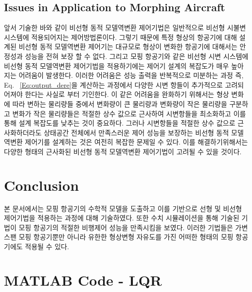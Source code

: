 \documentclass[a4paper, 12pt]{report}
\begin{document}
	\section{Issues in Application to Morphing Aircraft}
	
	앞서 기술한 바와 같이 비선형 동적 모델역변환 제어기법은 일반적으로 비선형 시불변 시스템에 적용되어지는 제어방법론이다. 그렇기 때문에 특정 형상의 항공기에 대해 설계된 비선형 동적 모델역변환 제어기는 대규모로 형상이 변화한 항공기에 대해서는 안정성과 성능을 전혀 보장 할 수 없다. 그리고 모핑 항공기와 같은 비선형 시변 시스템에 비선형 동적 모델역변환 제어기법을 적용하기에는 제어기 설계의 복잡도가 매우 높아지는 어려움이 발생한다. 이러한 어려움은 성능 출력을 반복적으로 미분하는 과정 즉, Eq.~ \eqref{Eq:output_dere}을 계산하는 과정에서 다양한 시변 항들이 추가적으로 고려되어져야 한다는 사실로 부터 기인한다. 이 같은 어려움을 완화하기 위해서는 형상 변화에 따라 변하는 물리량들 중에서 변화량이 큰 물리량과 변화량이 작은 물리량을 구분하고 변화가 작은 물리량들은 적절한 상수 값으로 근사하여 시변항들을 최소화하고 이를 통해 설계 복잡도를 낮추는 것이 중요하다. 그러나 시변항들을 적절한 상수 값으로 근사화하더라도 상태공간 전체에서 만족스러운 제어 성능을 보장하는 비선형 동적 모델역변환 제어기를 설계하는 것은 여전히 복잡한 문제일 수 있다. 이를 해결하기위해서는 다양한 형태의 근사화된 비선형 동적 모델역변환 제어기법이 고려될 수 있을 것이다.
	
	\chapter{Conclusion}
	
	본 문서에서는 모핑 항공기의 수학적 모델을 도출하고 이를 기반으로 선형 및 비선형 제어기법을 적용하는 과정에 대해 기술하였다.
	또한 수치 시뮬레이션을 통해 기술된 기법이 모핑 항공기의 적절한 비행제어 성능을 만족시킴을 보였다.
	이러한 기법들은 가변스팬 모핑 항공기뿐만 아니라 유한한 형상변형 자유도를 가진 어떠한 형태의 모핑 항공기에도 적용될 수 있다.
	
	\printbibliography
	
	\appendix
	
	\chapter{MATLAB Code - LQR}
	
\end{document}
